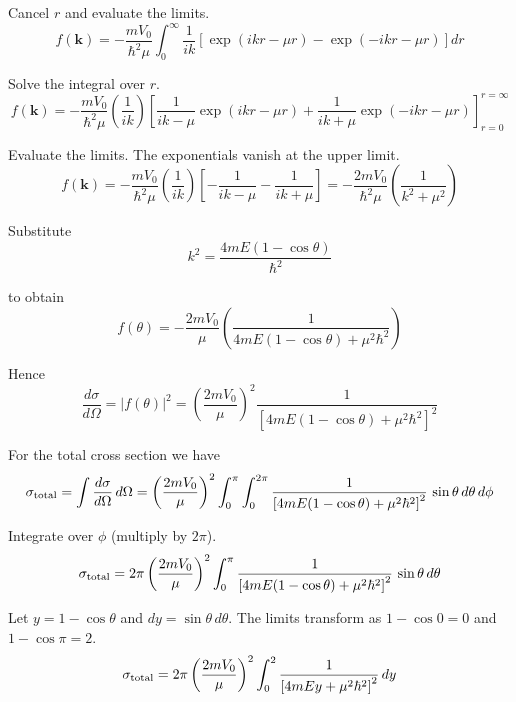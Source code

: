 Cancel $r$ and evaluate the limits.
\begin{equation*}
f(\mathbf k)=-\frac{mV_0}{\hbar^2\mu}
\int_0^\infty
\frac{1}{ik}
\left[\exp(ikr-\mu r)-\exp(-ikr-\mu r)\right]
dr
\end{equation*}

Solve the integral over $r$.
\begin{equation*}
f(\mathbf k)=-\frac{mV_0}{\hbar^2\mu}
\left(\frac{1}{ik}\right)
\left[
\frac{1}{ik-\mu}
\exp(ikr-\mu r)
+\frac{1}{ik+\mu}
\exp(-ikr-\mu r)
\right]_{r=0}^{r=\infty}
\end{equation*}

Evaluate the limits. The exponentials vanish at the upper limit.
\begin{equation*}
f(\mathbf k)=-\frac{mV_0}{\hbar^2\mu}
\left(\frac{1}{ik}\right)
\left[
-\frac{1}{ik-\mu}
-\frac{1}{ik+\mu}
\right]
=-\frac{2mV_0}{\hbar^2\mu}\left(\frac{1}{k^2+\mu^2}\right)
\tag{1}
\end{equation*}

Substitute
\begin{equation*}
k^2=\frac{4mE(1-\cos\theta)}{\hbar^2}
\end{equation*}

to obtain
\begin{equation*}
f(\theta)=-\frac{2mV_0}{\mu}\left(\frac{1}{4mE(1-\cos\theta)+\mu^2\hbar^2}\right)
\tag{2}
\end{equation*}

Hence
\begin{equation*}
\frac{d\sigma}{d\Omega}
=|f(\theta)|^2=\left(\frac{2mV_0}{\mu}\right)^2
\frac{1}{\left[4mE(1-\cos\theta)+\mu^2\hbar^2\right]^2}
\end{equation*}

For the total cross section we have
\begin{equation*}
\sigma_{\rm total}=\int\frac{d\sigma}{d\Omega}\,d\Omega
=\left(\frac{2mV_0}{\mu}\right)^2\int_0^\pi\int_0^{2\pi}
\frac{1}{\left[4mE(1-\cos\theta)+\mu^2\hbar^2\right]^2}\,\sin\theta\,d\theta\,d\phi
\end{equation*}

Integrate over $\phi$ (multiply by $2\pi$).
\begin{equation*}
\sigma_{\rm total}=2\pi\left(\frac{2mV_0}{\mu}\right)^2
\int_0^\pi\frac{1}{\left[4mE(1-\cos\theta)+\mu^2\hbar^2\right]^2}\,\sin\theta\,d\theta
\end{equation*}

Let $y=1-\cos\theta$ and $dy=\sin\theta\,d\theta$.
The limits transform as $1-\cos0=0$ and $1-\cos\pi=2$.
\begin{equation*}
\sigma_{\rm total}=2\pi\left(\frac{2mV_0}{\mu}\right)^2
\int_0^2\frac{1}{\left[4mEy+\mu^2\hbar^2\right]^2}\,dy
\end{equation*}

